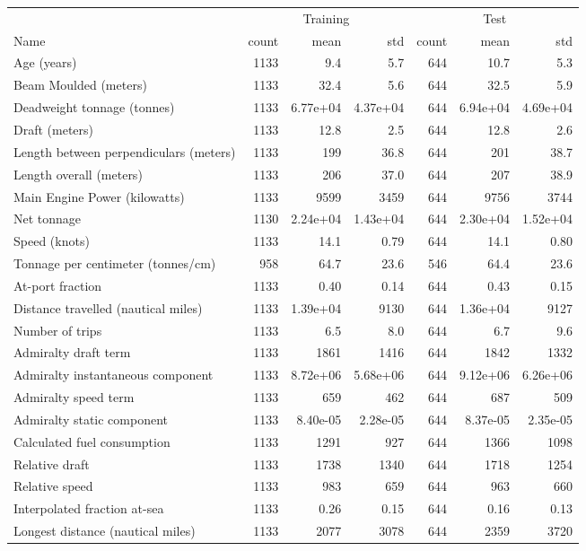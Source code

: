 
\begin{tabular}[t]{lrrrrrr}
\toprule
\multicolumn{1}{c}{ } & \multicolumn{3}{c}{Training} & \multicolumn{3}{c}{Test} \\
\cmidrule(l{3pt}r{3pt}){2-4} \cmidrule(l{3pt}r{3pt}){5-7}
Name & count & mean & std & count & mean & std\\
\midrule
Age (years) & 1133 & 9.4 & 5.7 & 644 & 10.7 & 5.3\\
Beam Moulded (meters) & 1133 & 32.4 & 5.6 & 644 & 32.5 & 5.9\\
Deadweight tonnage (tonnes) & 1133 & 6.77e+04 & 4.37e+04 & 644 & 6.94e+04 & 4.69e+04\\
Draft (meters) & 1133 & 12.8 & 2.5 & 644 & 12.8 & 2.6\\
Length between perpendiculars (meters) & 1133 & 199 & 36.8 & 644 & 201 & 38.7\\
\addlinespace
Length overall (meters) & 1133 & 206 & 37.0 & 644 & 207 & 38.9\\
Main Engine Power (kilowatts) & 1133 & 9599 & 3459 & 644 & 9756 & 3744\\
Net tonnage & 1130 & 2.24e+04 & 1.43e+04 & 644 & 2.30e+04 & 1.52e+04\\
Speed (knots) & 1133 & 14.1 & 0.79 & 644 & 14.1 & 0.80\\
Tonnage per centimeter (tonnes/cm) & 958 & 64.7 & 23.6 & 546 & 64.4 & 23.6\\
\addlinespace
At-port fraction & 1133 & 0.40 & 0.14 & 644 & 0.43 & 0.15\\
Distance travelled (nautical miles) & 1133 & 1.39e+04 & 9130 & 644 & 1.36e+04 & 9127\\
Number of trips & 1133 & 6.5 & 8.0 & 644 & 6.7 & 9.6\\
Admiralty draft term & 1133 & 1861 & 1416 & 644 & 1842 & 1332\\
Admiralty instantaneous component & 1133 & 8.72e+06 & 5.68e+06 & 644 & 9.12e+06 & 6.26e+06\\
\addlinespace
Admiralty speed term & 1133 & 659 & 462 & 644 & 687 & 509\\
Admiralty static component & 1133 & 8.40e-05 & 2.28e-05 & 644 & 8.37e-05 & 2.35e-05\\
Calculated fuel consumption & 1133 & 1291 & 927 & 644 & 1366 & 1098\\
Relative draft & 1133 & 1738 & 1340 & 644 & 1718 & 1254\\
Relative speed & 1133 & 983 & 659 & 644 & 963 & 660\\
\addlinespace
Interpolated fraction at-sea & 1133 & 0.26 & 0.15 & 644 & 0.16 & 0.13\\
Longest distance (nautical miles) & 1133 & 2077 & 3078 & 644 & 2359 & 3720\\
\bottomrule
\end{tabular}
